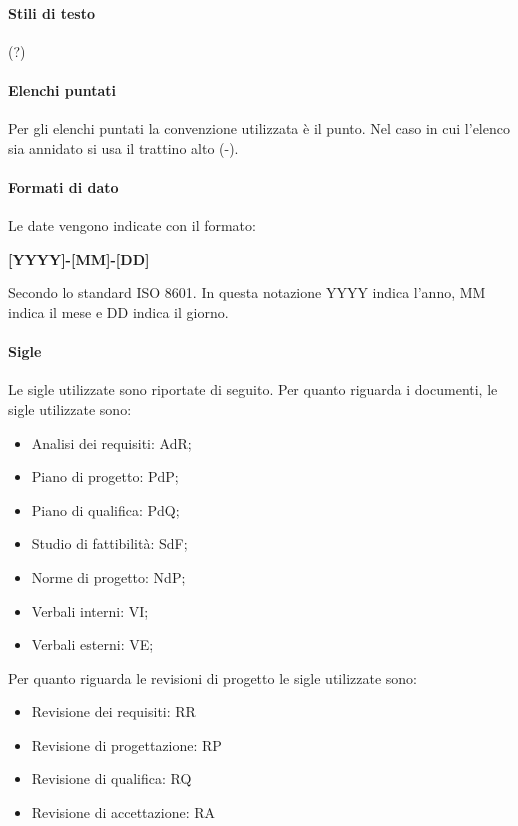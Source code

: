 \documentclass[../norme_di_progetto.tex]{subfiles}
\begin{document}
\paragraph{Stili di testo}
(?)

\paragraph{Elenchi puntati}
Per gli elenchi puntati la convenzione utilizzata è il punto. Nel caso in cui l'elenco sia annidato si usa il trattino alto (-).

\paragraph{Formati di dato}
Le date vengono indicate con il formato:
\begin{center}
    \textbf{[YYYY]-[MM]-[DD]}
\end{center}
Secondo lo standard ISO 8601. In questa notazione YYYY indica l'anno, MM indica il mese e DD indica il giorno.

\paragraph{Sigle}
Le sigle utilizzate sono riportate di seguito.
Per quanto riguarda i documenti, le sigle utilizzate sono:
\begin{itemize}
    \item Analisi dei requisiti: AdR;
    \item Piano di progetto: PdP;
    \item Piano di qualifica: PdQ;
    \item Studio di fattibilità: SdF;
    \item Norme di progetto: NdP;
    \item Verbali interni: VI;
    \item Verbali esterni: VE;
\end{itemize}

Per quanto riguarda le revisioni di progetto le sigle utilizzate sono:
\begin{itemize}
    \item Revisione dei requisiti: RR
    \item Revisione di progettazione: RP
    \item Revisione di qualifica: RQ
    \item Revisione di accettazione: RA
\end{itemize}
\end{document}
